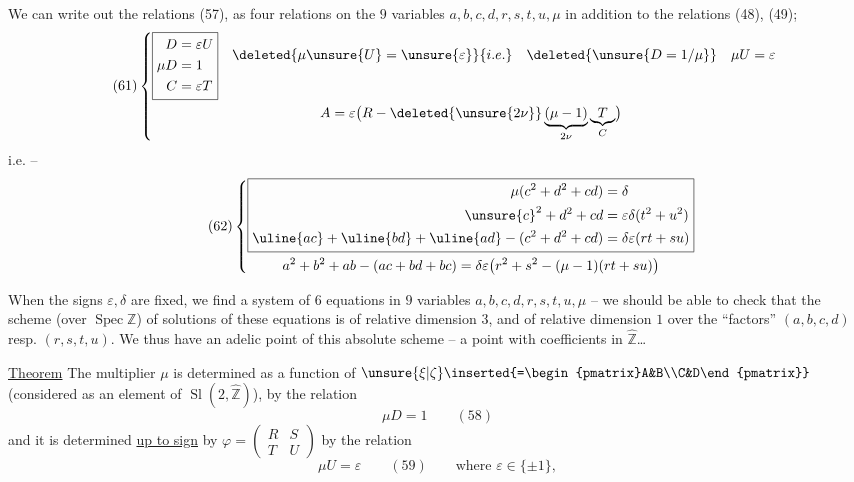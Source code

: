 We can write out the relations (57), as  four relations on the $9$ variables $a,b,c,d,r,s,t,u,\mu$ in addition to the relations (48), (49);
\[
\tag{61}
\left\{\begin{gathered}
\boxed{\begin{aligned}
D&=\varepsilon U\\
\mu D&=1\\
C&=\varepsilon T
\end{aligned}}
\quad\begin{aligned}
\deleted{\mu\unsure{U}=\unsure{\varepsilon}}{i.e.}\quad\deleted{\unsure{D=1/\mu}}\quad\mu U=\varepsilon\\
&
\end{aligned}\\
A=\varepsilon\bigl(R-\deleted{\unsure{2\nu}}\underbrace{(\mu-1)}_{2\nu}\underbrace{T}_{C}\bigr)
\end{gathered}\right.
\]
i.e. --  
\[
\tag{62}
\left\{\begin{gathered}
\boxed{\begin{aligned}
\mu(c^2+d^2+cd)&=\delta\\
\unsure{c}^2+d^2+cd&=\varepsilon\delta(t^2+u^2)\\
\uline{ac}+\uline{bd}+\uline{ad}-(c^2+d^2+cd)&=\delta\varepsilon(rt+su)
\end{aligned}}\\
a^2+b^2+ab-(ac+bd+bc)=\delta\varepsilon\bigl(r^2+s^2-(\mu-1)(rt+su)\bigr)
\end{gathered}\right.
\]

When the signs $\varepsilon,\delta$ are fixed, we find  a system of $6$ equations in $9$ variables $a,b,c,d,r,s,t,u,\mu$ -- we should be able to check that the scheme (over $\operatorname{Spec}\mathbb Z$) of solutions of these equations is of relative dimension $3$, and of relative dimension $1$ over the ``factors'' $(a,b,c,d)$ resp. $(r,s,t,u)$. We thus have an adelic point of this absolute scheme -- a point with coefficients in $\widehat{\mathbb Z}$\ldots
{}

\uline{Theorem} The multiplier $\mu$ is determined as a function of $\unsure{\xi|\zeta}\inserted{=\begin{pmatrix}A&B\\C&D\end{pmatrix}}$ (considered as an element of $\operatorname{Sl}(2,\widehat{\mathbb Z})$), by the relation
\[
\mu D=1\qquad(58)
\]
\unsure{\textup{(+)}}
and it is determined \uline{up to sign} by $\varphi=\begin{pmatrix}R&S\\T&U\end{pmatrix}$ by the relation
\[
\mu U=\varepsilon\qquad(59)\qquad\text{where }\varepsilon\in\{\pm1\},
\]

